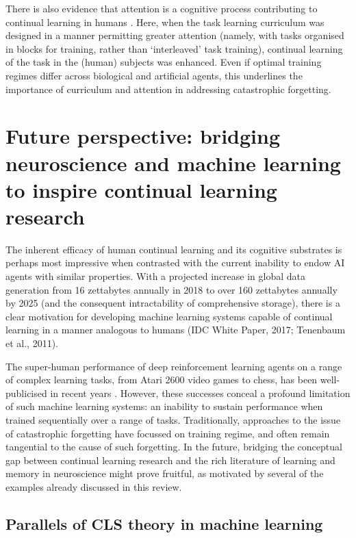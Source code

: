 \documentclass{article} %
\begin{document}
There is also evidence that attention is a cognitive process contributing to continual learning in humans \citep{flesch2018comparing}. Here, when the task learning curriculum was designed in a manner permitting greater attention (namely, with tasks organised in blocks for training, rather than ‘interleaved’ task training), continual learning of the task in the (human) subjects was enhanced. Even if optimal training regimes differ across biological and artificial agents, this underlines the importance of curriculum and attention in addressing catastrophic forgetting.

\section*{Future perspective: bridging neuroscience and machine learning to inspire continual learning research}

The inherent efficacy of human continual learning and its cognitive substrates is perhaps most impressive when contrasted with the current inability to endow AI agents with similar properties. With a projected increase in global data generation from 16 zettabytes annually in 2018 to over 160 zettabytes annually by 2025 (and the consequent intractability of comprehensive storage), there is a clear motivation for developing machine learning systems capable of continual learning in a manner analogous to humans (IDC White Paper, 2017; Tenenbaum et al., 2011).

The super-human performance of deep reinforcement learning agents on a range of complex learning tasks, from Atari 2600 video games to chess, has been well-publicised in recent years \citep{mnih2015human,silver2016mastering,kasparov2018chess,lecun2015deep}. However, these successes conceal a profound limitation of such machine learning systems: an inability to sustain performance when trained sequentially over a range of tasks. Traditionally, approaches to the issue of catastrophic forgetting have focussed on training regime, and often remain tangential to the cause of such forgetting. In the future, bridging the conceptual gap between continual learning research and the rich literature of learning and memory in neuroscience might prove fruitful, as motivated by several of the examples already discussed in this review.

\subsection*{Parallels of CLS theory in machine learning}
\end{document}
